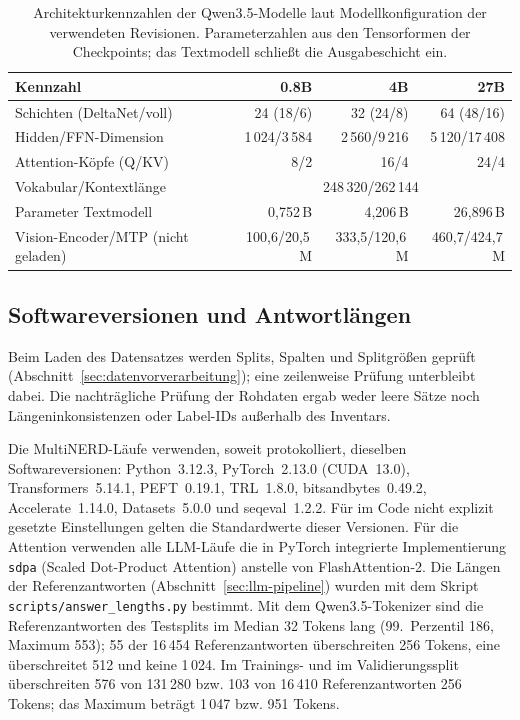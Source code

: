 \begin{table}[ht]
    \centering
    \small
    \caption[Architekturkennzahlen der Qwen3.5-Modelle]{Architekturkennzahlen der Qwen3.5-Modelle laut
    Modellkonfiguration der verwendeten Revisionen.
    Parameterzahlen aus den Tensorformen der Checkpoints; das Textmodell
    schließt die Ausgabeschicht ein.}
    \label{tab:app-qwen-architektur}
    \begin{tabular}{lrrr}
        \toprule
        \textbf{Kennzahl} & \textbf{0.8B} & \textbf{4B} & \textbf{27B} \\
        \midrule
        Schichten (DeltaNet/voll)  & 24 (18/6) & 32 (24/8) & 64 (48/16) \\
        Hidden/FFN-Dimension       & 1\,024/3\,584 & 2\,560/9\,216 & 5\,120/17\,408 \\
        Attention-Köpfe (Q/KV)     & 8/2 & 16/4 & 24/4 \\
        Vokabular/Kontextlänge     & \multicolumn{3}{c}{248\,320/262\,144} \\
        Parameter Textmodell       & 0,752\,B & 4,206\,B & 26,896\,B \\
        Vision-Encoder/MTP (nicht geladen) & 100,6/20,5\,M & 333,5/120,6\,M & 460,7/424,7\,M \\
        \bottomrule
    \end{tabular}
\end{table}

\subsection{Softwareversionen und Antwortlängen}
\label{app:software}


Beim Laden des Datensatzes werden Splits, Spalten und Splitgrößen
geprüft (Abschnitt~\ref{sec:datenvorverarbeitung}); eine zeilenweise
Prüfung unterbleibt dabei.
Die nachträgliche Prüfung der Rohdaten ergab weder leere Sätze noch
Längeninkonsistenzen oder Label-IDs außerhalb des Inventars.

Die MultiNERD-Läufe verwenden, soweit protokolliert, dieselben
Softwareversionen: Python~3.12.3, PyTorch~2.13.0 (CUDA~13.0),
Transformers~5.14.1, PEFT~0.19.1, TRL~1.8.0, bitsandbytes~0.49.2,
Accelerate~1.14.0, Datasets~5.0.0 und seqeval~1.2.2.
Für im Code nicht explizit gesetzte Einstellungen gelten die
Standardwerte dieser Versionen.
Für die Attention verwenden alle LLM-Läufe die in PyTorch integrierte
Implementierung \texttt{sdpa} (Scaled Dot-Product Attention) anstelle von
FlashAttention-2.
Die Längen der Referenzantworten (Abschnitt~\ref{sec:llm-pipeline})
wurden mit dem Skript \texttt{scripts/answer\_lengths.py} bestimmt.
Mit dem Qwen3.5-Tokenizer sind die Referenzantworten des Testsplits
im Median 32 Tokens lang (99.~Perzentil 186, Maximum 553); 55 der
16\,454 Referenzantworten überschreiten 256 Tokens, eine überschreitet
512 und keine 1\,024.
Im Trainings- und im Validierungssplit überschreiten 576 von 131\,280
bzw. 103 von 16\,410 Referenzantworten 256 Tokens; das Maximum beträgt
1\,047 bzw. 951 Tokens.

